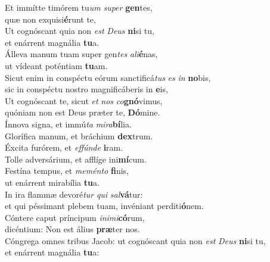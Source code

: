 \evenverse Et immítte timórem tu\textit{um} \textit{su}\textit{per} \textbf{gen}tes,~\*\\
\evenverse quæ non exquisi\textbf{é}runt te,\\
\oddverse Ut cognóscant quia non \textit{est} \textit{De}\textit{us} \textbf{ni}si tu,~\*\\
\oddverse et enárrent magnália \textbf{tu}a.\\
\evenverse Álleva manum tuam super gen\textit{tes} \textit{a}\textit{li}\textbf{é}nas,~\*\\
\evenverse ut vídeant poténtiam \textbf{tu}am.\\
\oddverse Sicut enim in conspéctu eórum sanctificá\textit{tus} \textit{es} \textit{in} \textbf{no}bis,~\*\\
\oddverse sic in conspéctu nostro magnificáberis in \textbf{e}is,\\
\evenverse Ut cognóscant te, sicut \textit{et} \textit{nos} \textit{co}\textbf{gnó}vimus,~\*\\
\evenverse quóniam non est Deus præter te, \textbf{Dó}mine.\\
\oddverse Ínnova signa, et immú\textit{ta} \textit{mi}\textit{ra}\textbf{bí}lia.~\*\\
\oddverse Glorífica manum, et bráchium \textbf{dex}trum.\\
\evenverse Éxcita furórem, et \textit{ef}\textit{fún}\textit{de} \textbf{i}ram.~\*\\
\evenverse Tolle adversárium, et afflíge ini\textbf{mí}cum.\\
\oddverse Festína tempus, et \textit{me}\textit{mén}\textit{to} \textbf{fi}nis,~\*\\
\oddverse ut enárrent mirabília \textbf{tu}a.\\
\evenverse In ira flammæ devoré\textit{tur} \textit{qui} \textit{sal}\textbf{vá}tur:~\*\\
\evenverse et qui péssimant plebem tuam, invéniant perditi\textbf{ó}nem.\\
\oddverse Cóntere caput príncipum \textit{i}\textit{ni}\textit{mi}\textbf{có}rum,~\*\\
\oddverse dicéntium: Non est álius \textbf{præ}ter nos.\\
\evenverse Cóngrega omnes tribus Jacob: ut cognóscant quia non \textit{est} \textit{De}\textit{us} \textbf{ni}si tu,~\*\\
\evenverse et enárrent magnália \textbf{tu}a:\\
